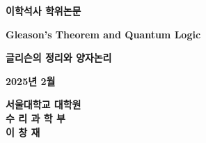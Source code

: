 \begin{titlepage}
    \begin{center}
    \huge
    \textbf{이학석사 학위논문}    
    \vspace*{2cm}
    
    \LARGE
    \textbf{Gleason's Theorem and Quantum Logic}
    
    \vspace{1.0cm}
    \LARGE
    \textbf{글리슨의 정리와 양자논리}
    
    \vspace{2.0cm}
    
    \textbf{2025년 2월}
    
    \vfill
    
    
    
    \Large

    \textbf{서울대학교 대학원}\\
    \textbf{수 리 과 학 부}\\
    \vspace{0.5cm}
    \textbf{이 창 재}
    
    \end{center}
\end{titlepage}

